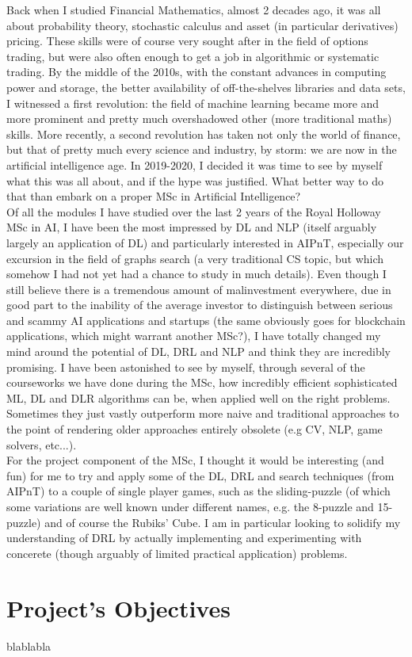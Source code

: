 Back when I studied Financial Mathematics, almost 2 decades ago, it was all about probability theory, stochastic calculus and asset (in particular derivatives) pricing. These skills were of course very sought after in the field of options trading, but were also often enough to get a job in algorithmic or systematic trading. By the middle of the 2010s, with the constant advances in computing power and storage, the better availability of off-the-shelves libraries and data sets, I witnessed a first revolution: the field of machine learning became more and more prominent and pretty much overshadowed other (more traditional maths) skills. More recently, a  second revolution has taken not only the world of finance, but that of pretty much every science and industry, by storm: we are now in the artificial intelligence age.
In 2019-2020, I decided it was time to see by myself what this was all about, and if the hype was justified. What better way to do that than embark on a proper MSc in Artificial Intelligence?
\\
Of all the modules I have studied over the last 2 years of the Royal Holloway MSc in AI, I have been the most impressed by DL and  NLP (itself arguably largely an application of DL) and particularly interested in AIPnT, especially our excursion in the field of graphs search (a very traditional CS topic, but which somehow I had not yet had a chance to study in much details). Even though I still believe there is a tremendous amount of malinvestment  everywhere, due in good part to the inability of the average investor to distinguish between serious and scammy AI applications and startups (the same obviously goes for blockchain applications, which might warrant another MSc?), I have totally changed my mind around the potential of DL, DRL and NLP and think they are incredibly promising. I have been astonished to see by myself, through several of the courseworks we have done during the MSc, how incredibly efficient sophisticated ML, DL and DLR algorithms can be, when applied well on the right problems. Sometimes they just vastly outperform more naive and traditional approaches to the point of rendering older approaches entirely obsolete (e.g CV, NLP, game solvers, etc...).
\\
For the project component of the MSc, I thought it would be interesting (and fun) for me to try and apply some of the DL, DRL and search techniques (from AIPnT) to a couple of single player games, such as the sliding-puzzle (of which some variations are well known under different names, e.g. the 8-puzzle and 15-puzzle) and of course the Rubiks' Cube. I am in particular looking to solidify my understanding of DRL by actually implementing and experimenting with concerete (though arguably of limited practical application) problems.



\section{Project's Objectives}

blablabla

